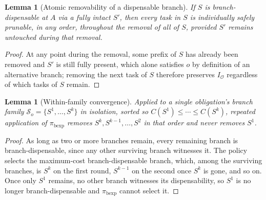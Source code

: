 \documentclass[11pt]{report}
\newtheorem{lemma}[definition]{Lemma}
\begin{document}
\begin{lemma}[Atomic removability of a dispensable branch]
If $S$ is branch-dispensable at $A$ via a fully intact $S'$, then every task in $S$ is individually safely prunable, in any order, throughout the removal of all of $S$, provided $S'$ remains untouched during that removal.
\end{lemma}
\begin{proof}
At any point during the removal, some prefix of $S$ has already been removed and $S'$ is still fully present, which alone satisfies $o$ by definition of an alternative branch; removing the next task of $S$ therefore preserves $I_{\mathcal O}$ regardless of which tasks of $S$ remain.
\end{proof}

\begin{lemma}[Within-family convergence]
Applied to a single obligation's branch family $\mathcal S_o = \{S^1, \ldots, S^k\}$ in isolation, sorted so $C(S^1) \le \cdots \le C(S^k)$, repeated application of $\pi_{\mathrm{bexp}}$ removes $S^k, S^{k-1}, \ldots, S^2$ in that order and never removes $S^1$.
\end{lemma}
\begin{proof}
As long as two or more branches remain, every remaining branch is branch-dispensable, since any other surviving branch witnesses it. The policy selects the maximum-cost branch-dispensable branch, which, among the surviving branches, is $S^k$ on the first round, $S^{k-1}$ on the second once $S^k$ is gone, and so on. Once only $S^1$ remains, no other branch witnesses its dispensability, so $S^1$ is no longer branch-dispensable and $\pi_{\mathrm{bexp}}$ cannot select it.
\end{proof}
\end{document}
